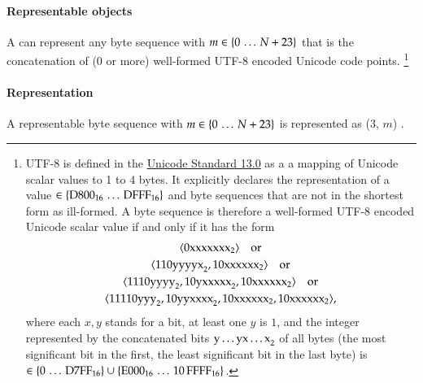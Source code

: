\paragraph{Representable objects}

A \DborUtfEightStringValue{} can represent any byte sequence 
with $m \in \{0 \,\ldots\, N + 23\}$ that is the concatenation of ($0$ or more)
well-formed UTF-8 encoded Unicode code points.%
\footnote{
    UTF-8 is defined in the
    \href{https://www.unicode.org/versions/Unicode13.0.0/ch03.pdf\#G31703}{Unicode Standard 13.0}
    as a a mapping of Unicode scalar values to 1 to 4 bytes.
    It explicitly declares the representation of a value $\in \{\mathrm{D800}_{16} \,\ldots\, \mathrm{DFFF}_{16}\}$
    and byte sequences that are not in the shortest form as ill-formed.
    A byte sequence  is therefore a well-formed UTF-8 encoded Unicode scalar value if and
    only if it has the form
    \begin{gather*}
        \langle \mathrm{0xxxxxxx}_{2} \rangle \quad\text{or} \\
        \langle \mathrm{110yyyyx}_{2}, \mathrm{10xxxxxx}_{2} \rangle \quad\text{or} \\
        \langle \mathrm{1110yyyy}_{2}, \mathrm{10yxxxxx}_{2}, \mathrm{10xxxxxx}_{2} \rangle \quad\text{or} \\
        \langle \mathrm{11110yyy}_{2}, \mathrm{10yyxxxx}_{2}, \mathrm{10xxxxxx}_{2}, \mathrm{10xxxxxx}_{2} \rangle,
    \end{gather*}
    where each $x, y$ stands for a bit, at least one $y$ is $1$, and the integer represented by
    the concatenated bits $\mathrm{y \ldots y x \ldots x}_{2}$ of all bytes
    (the most significant bit in the first, the least significant bit in the last byte) is
    $\in \{0 \,\ldots\, \mathrm{D7FF}_{16}\} \cup \{\mathrm{E000}_{16} \,\ldots\, \mathrm{10\,FFFF}_{16}\}$.
}

\paragraph{Representation}

A representable byte sequence  with $m \in \{0 \,\ldots\, N + 23\}$
is represented as \DborIntegerToken*($3$, $m$) {\Concat} .

